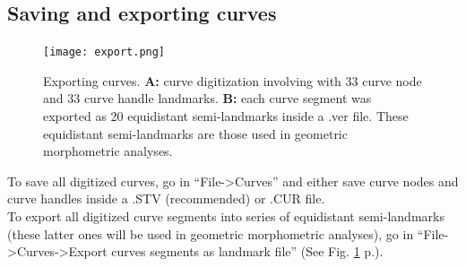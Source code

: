 \documentclass[12pt, a4paper]{book}
\begin{document}
\subsection{Saving and exporting curves}
\begin{figure}
  \centering
  \texttt{[image: export.png]} 
	\caption{Exporting curves. \textbf{A:} curve digitization involving with 33 curve node and 33 curve handle landmarks. \textbf{B:} each curve segment was exported as 20 equidistant semi-landmarks inside a .ver file. These equidistant semi-landmarks are those used in geometric morphometric analyses.}
	\label{export}
 
\end{figure}
To save all digitized curves, go in “File->Curves” and either save curve nodes and curve handles inside a .STV (recommended) or .CUR file.\\ 
To export all digitized curve segments into series of equidistant semi-landmarks (these latter ones will be used in geometric morphometric analyses), go in “File->Curves->Export curves segments as landmark file” (See Fig. \ref{export} p.\pageref{export}).
\end{document}
